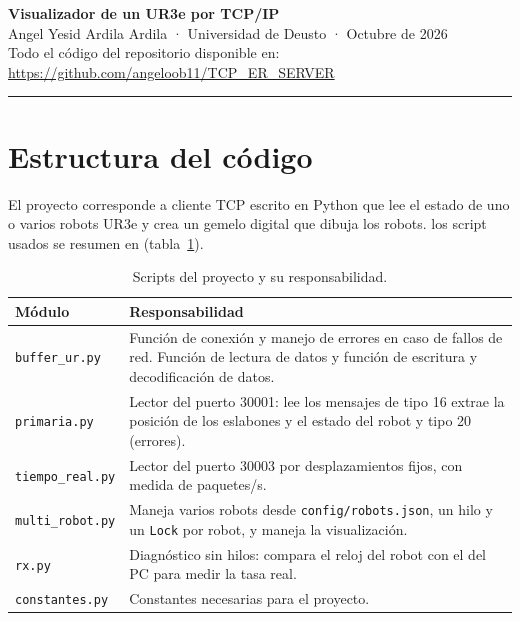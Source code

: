 \documentclass[10pt,a4paper]{article}
\newcommand{\code}[1]{\texttt{\small #1}}
\begin{document}
\begin{center}
{\LARGE\bfseries\color{azul} Visualizador de un UR3e por TCP/IP}\\[3pt]
{\normalsize Angel Yesid Ardila Ardila · Universidad de Deusto · Octubre de 2026}\\[2pt]
{\small Todo el código del repositorio disponible en: \url{https://github.com/angeloob11/TCP_ER_SERVER}}
\end{center}
\vspace{-4pt}
\noindent\rule{\linewidth}{0.4pt}

\section{Estructura del código}

El proyecto corresponde a cliente TCP escrito en Python que lee el estado de uno o varios robots UR3e y crea un gemelo digital que dibuja los robots. los script usados se resumen en  (tabla~\ref{tab:modulos}).
\begin{table}[h]
\centering\small
\renewcommand{\arraystretch}{1.25}
\caption{Scripts del proyecto y su responsabilidad.}\label{tab:modulos}
\begin{tabularx}{\linewidth}{@{}>{\color{azul}}l >{\raggedright\arraybackslash}X@{}}
\toprule
\textbf{Módulo} & \textbf{Responsabilidad} \\ \midrule
\code{buffer\_ur.py}   & Función de conexión y manejo de errores en caso de fallos de red. Función de lectura de datos y función de escritura y decodificación de datos. \\
\code{primaria.py}     & Lector del puerto 30001: lee los mensajes de tipo 16 extrae la posición de los eslabones y el estado del robot y tipo 20 (errores). \\
\code{tiempo\_real.py} & Lector del puerto 30003 por desplazamientos fijos, con medida de paquetes/s. \\
\code{multi\_robot.py} &  Maneja varios robots desde \code{config/robots.json}, un hilo y un \code{Lock} por robot, y maneja la visualización. \\
\code{rx.py}           & Diagnóstico sin hilos: compara el reloj del robot con el del PC para medir la tasa real. \\
\code{constantes.py}   & Constantes necesarias para el proyecto. \\ \bottomrule
\end{tabularx}
\end{table}
\end{document}
